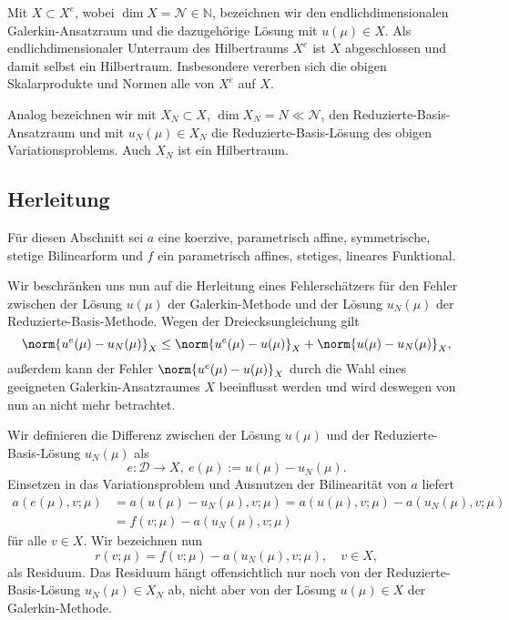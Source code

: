 Mit $X \subset X^e$, wobei $\dim X = \mathcal N \in \mathbb{N}$, bezeichnen wir den endlichdimensionalen Galerkin-Ansatzraum und die dazugehörige Lösung mit $u(\mu) \in X$.
Als endlichdimensionaler Unterraum des Hilbertraums $X^e$ ist $X$ abgeschlossen und damit selbst ein Hilbertraum.
Insbesondere vererben sich die obigen Skalarprodukte und Normen alle von $X^e$ auf $X$.

Analog bezeichnen wir mit $X_N \subset X$, $\dim X_N = N \ll \mathcal N$, den Reduzierte-Basis-Ansatzraum und mit $u_N(\mu) \in X_N$ die Reduzierte-Basis-Lösung des obigen Variationsproblems.
Auch $X_N$ ist ein Hilbertraum.

\subsection{Herleitung} %
\label{sub:herleitung}

Für diesen Abschnitt sei $a$ eine koerzive, parametrisch affine, symmetrische, stetige Bilinearform und $f$ ein parametrisch affines, stetiges, lineares Funktional.

Wir beschränken uns nun auf die Herleitung eines Fehlerschätzers für den Fehler zwischen der Lösung $u(\mu)$ der Galerkin-Methode und der Lösung $u_N(\mu)$ der Reduzierte-Basis-Methode. Wegen der Dreiecksungleichung gilt
\begin{equation}
    \norm{u^e(\mu) - u_N(\mu)}_X \leq \norm{u^e(\mu) - u(\mu)}_X + \norm{u(\mu) - u_N(\mu)}_X,
\end{equation}
außerdem kann der Fehler $\norm{u^e(\mu) - u(\mu)}_X$ durch die Wahl eines geeigneten Galerkin-Ansatzraumes $X$ beeinflusst werden und wird deswegen von nun an nicht mehr betrachtet.

Wir definieren die Differenz zwischen der Lösung $u(\mu)$ und der Reduzierte-Basis-Lösung $u_N(\mu)$ als
\begin{equation}
    \label{eq:fehler_fe_und_rb_lsg}
    e \colon \mathcal D \to X, ~
    e(\mu) := u(\mu) - u_N(\mu).
\end{equation}
Einsetzen in das Variationsproblem und Ausnutzen der Bilinearität von $a$ liefert
\begin{align}
    a(e(\mu), v; \mu)
    &= a(u(\mu) - u_N(\mu), v; \mu)
    = a(u(\mu), v; \mu) - a(u_N(\mu), v; \mu) \\
    &= f(v; \mu) - a(u_N(\mu), v; \mu)
\end{align}
für alle $v \in X$.
Wir bezeichnen nun
\begin{equation}
    \label{eq:def_residuum}
    r(v; \mu) = f(v; \mu) - a(u_N(\mu), v; \mu), \quad v \in X,
\end{equation}
als Residuum.
Das Residuum hängt offensichtlich nur noch von der Reduzierte-Basis-Lösung $u_N(\mu) \in X_N$ ab, nicht aber von der Lösung $u(\mu) \in X$ der Galerkin-Methode.

